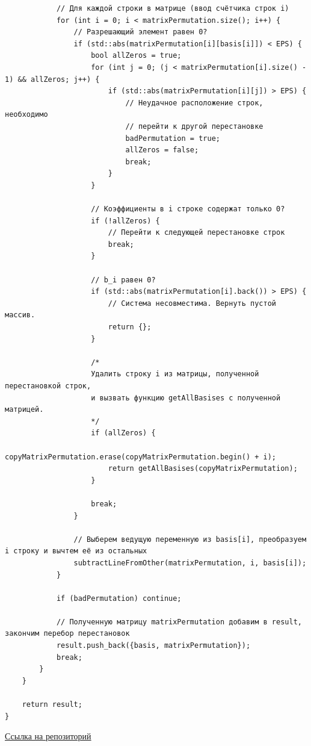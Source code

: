\documentclass[a4paper,14pt]{extarticle}
\begin{document}
\begin{verbatim}
            // Для каждой строки в матрице (ввод счётчика строк i)
            for (int i = 0; i < matrixPermutation.size(); i++) {
                // Разрешающий элемент равен 0? 
                if (std::abs(matrixPermutation[i][basis[i]]) < EPS) {
                    bool allZeros = true;
                    for (int j = 0; (j < matrixPermutation[i].size() - 1) && allZeros; j++) {
                        if (std::abs(matrixPermutation[i][j]) > EPS) {
                            // Неудачное расположение строк, необходимо
                            // перейти к другой перестановке
                            badPermutation = true;
                            allZeros = false;
                            break;
                        }
                    }

                    // Коэффициенты в i строке содержат только 0?
                    if (!allZeros) {
                        // Перейти к следующей перестановке строк
                        break;
                    }

                    // b_i равен 0?
                    if (std::abs(matrixPermutation[i].back()) > EPS) {
                        // Система несовместима. Вернуть пустой массив.
                        return {};
                    }

                    /*
                    Удалить строку i из матрицы, полученной перестановкой строк,
                    и вызвать функцию getAllBasises с полученной матрицей.
                    */
                    if (allZeros) {
                        copyMatrixPermutation.erase(copyMatrixPermutation.begin() + i);
                        return getAllBasises(copyMatrixPermutation);
                    }

                    break;
                }

                // Выберем ведущую переменную из basis[i], преобразуем i строку и вычтем её из остальных
                subtractLineFromOther(matrixPermutation, i, basis[i]);
            }

            if (badPermutation) continue;

            // Полученную матрицу matrixPermutation добавим в result, закончим перебор перестановок
            result.push_back({basis, matrixPermutation});
            break;
        }
    }

    return result;
}
    \end{verbatim}
\href{https://github.com/IAmProgrammist/operations_research/blob/master/src/libs/alg/lab1/task1.tpp}{Ссылка на репозиторий}\\
\end{document}
